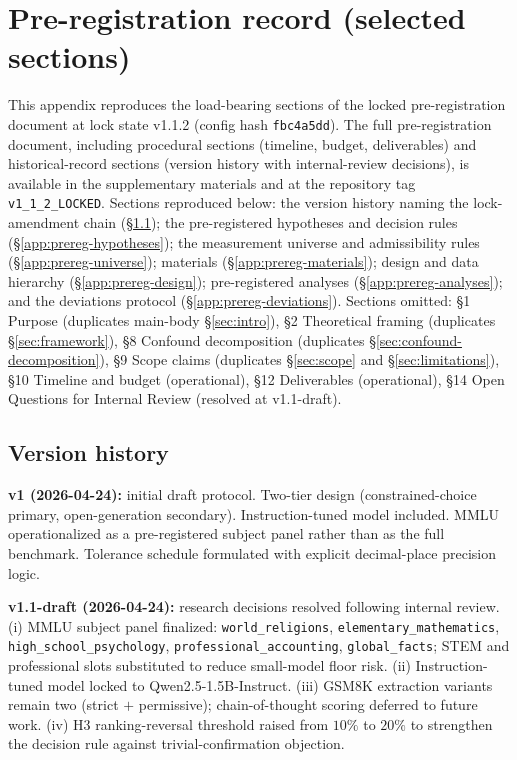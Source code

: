 \documentclass[11pt]{article}
\begin{document}
\appendix

\section{Pre-registration record (selected sections)}
\label{app:prereg}

\sloppy

This appendix reproduces the load-bearing sections of the locked pre-registration document at lock state v1.1.2 (config hash \texttt{fbc4a5dd}). The full pre-registration document, including procedural sections (timeline, budget, deliverables) and historical-record sections (version history with internal-review decisions), is available in the supplementary materials and at the repository tag \texttt{v1\_1\_2\_LOCKED}. Sections reproduced below: the version history naming the lock-amendment chain (§\ref{app:prereg-version-history}); the pre-registered hypotheses and decision rules (§\ref{app:prereg-hypotheses}); the measurement universe and admissibility rules (§\ref{app:prereg-universe}); materials (§\ref{app:prereg-materials}); design and data hierarchy (§\ref{app:prereg-design}); pre-registered analyses (§\ref{app:prereg-analyses}); and the deviations protocol (§\ref{app:prereg-deviations}). Sections omitted: §1 Purpose (duplicates main-body §\ref{sec:intro}), §2 Theoretical framing (duplicates §\ref{sec:framework}), §8 Confound decomposition (duplicates §\ref{sec:confound-decomposition}), §9 Scope claims (duplicates §\ref{sec:scope} and §\ref{sec:limitations}), §10 Timeline and budget (operational), §12 Deliverables (operational), §14 Open Questions for Internal Review (resolved at v1.1-draft).

\subsection{Version history}
\label{app:prereg-version-history}

\textbf{v1 (2026-04-24):} initial draft protocol. Two-tier design (constrained-choice primary, open-generation secondary). Instruction-tuned model included. MMLU operationalized as a pre-registered subject panel rather than as the full benchmark. Tolerance schedule formulated with explicit decimal-place precision logic.

\textbf{v1.1-draft (2026-04-24):} research decisions resolved following internal review. (i) MMLU subject panel finalized: \texttt{world\_religions}, \texttt{elementary\_mathematics}, \texttt{high\_school\_psychology}, \texttt{professional\_accounting}, \texttt{global\_facts}; STEM and professional slots substituted to reduce small-model floor risk. (ii) Instruction-tuned model locked to Qwen2.5-1.5B-Instruct. (iii) GSM8K extraction variants remain two (strict $+$ permissive); chain-of-thought scoring deferred to future work. (iv) H3 ranking-reversal threshold raised from $10\%$ to $20\%$ to strengthen the decision rule against trivial-confirmation objection.
\end{document}
